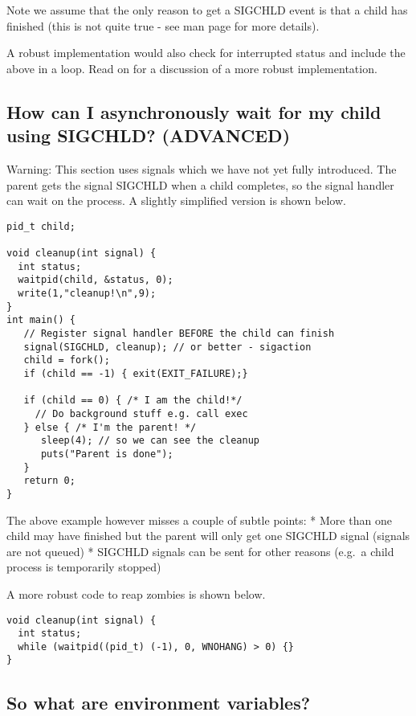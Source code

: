 Note we assume that the only reason to get a SIGCHLD event is that a
child has finished (this is not quite true - see man page for more
details).

A robust implementation would also check for interrupted status and
include the above in a loop. Read on for a discussion of a more robust
implementation.

\subsection{How can I asynchronously wait for my child using SIGCHLD?
(ADVANCED)}\label{how-can-i-asynchronously-wait-for-my-child-using-sigchld-advanced}

Warning: This section uses signals which we have not yet fully
introduced. The parent gets the signal SIGCHLD when a child completes,
so the signal handler can wait on the process. A slightly simplified
version is shown below.

\begin{verbatim}
pid_t child;

void cleanup(int signal) {
  int status;
  waitpid(child, &status, 0);
  write(1,"cleanup!\n",9);
}
int main() {
   // Register signal handler BEFORE the child can finish
   signal(SIGCHLD, cleanup); // or better - sigaction
   child = fork();
   if (child == -1) { exit(EXIT_FAILURE);}

   if (child == 0) { /* I am the child!*/
     // Do background stuff e.g. call exec   
   } else { /* I'm the parent! */
      sleep(4); // so we can see the cleanup
      puts("Parent is done");
   }
   return 0;
} 
\end{verbatim}

The above example however misses a couple of subtle points: * More than
one child may have finished but the parent will only get one SIGCHLD
signal (signals are not queued) * SIGCHLD signals can be sent for other
reasons (e.g.~a child process is temporarily stopped)

A more robust code to reap zombies is shown below.

\begin{verbatim}
void cleanup(int signal) {
  int status;
  while (waitpid((pid_t) (-1), 0, WNOHANG) > 0) {}
}
\end{verbatim}

\subsection{So what are environment
variables?}\label{so-what-are-environment-variables}

